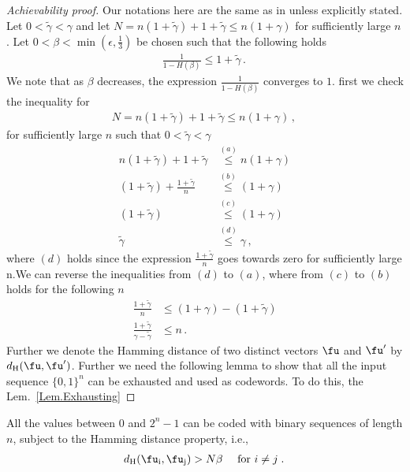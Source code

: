 \begin{proof}[Achievability proof]
Our notations here are the same as in \cite{J85} unless explicitly stated. Let $0<\tilde{\gamma}<\gamma$ and let $N=n(1+\tilde{\gamma})+1+\tilde{\gamma} \leq n(1+\gamma)$ for sufficiently large $n$. Let $0<\beta<\min(\epsilon,\frac{1}{3})$ be chosen such that the following holds
%
\begin{align}
    \frac{1}{1-H(\beta)} \leq 1+\tilde{\gamma} \,.\,
\end{align}
%
We note that as $\beta$ decreases, the expression $ \frac{1}{1-H(\beta)}$ converges to $1$. 
first we check the inequality for
\begin{align}
    N=n(1+\tilde{\gamma})+1+\tilde{\gamma} \leq n(1+\gamma) \,,\,
\end{align}
for sufficiently large $n$ such that $0<\tilde{\gamma}<\gamma$
\begin{align}
    n(1+\tilde{\gamma})+1+\tilde{\gamma} &\stackrel{(a)}{\leq} n(1+\gamma)\\
    (1+\tilde{\gamma})+\frac{1+\tilde{\gamma}}{n} &\stackrel{(b)}{\leq} (1+\gamma)\\
    (1+\tilde{\gamma}) &\stackrel{(c)}{\leq} (1+\gamma)\\
    \tilde{\gamma} &\stackrel{(d)}{\leq} \gamma  \,,\,
\end{align}
where $(d)$ holds since the expression $\frac{1+\tilde{\gamma}}{n}$ goes towards zero for sufficiently large n.We can reverse the inequalities from $(d)$ to $(a)$, where from $(c)$ to $(b)$ holds for the following $n$
\begin{align}
\nonumber
    \frac{1+\tilde{\gamma}}{n} &\leq (1+\gamma)-(1+\tilde{\gamma}) \\
    \nonumber
   \frac{1+\tilde{\gamma}}{\gamma-\tilde{\gamma}} &\leq n  \,.\,
\end{align}
Further we denote the Hamming distance of two distinct vectors $\fu$ and $\fu'$ by $d_{\text{H}}(\fu,\fu')$. Further we need the following lemma to show that all the input sequence $\{0,1\}^n$ can be exhausted and used as codewords. To do this, the Lem.~\ref{Lem.Exhausting}
\end{proof}
\begin{lemma}
\label{Lem.Exhausting}
All the values between $0$ and $2^n-1$ can be coded with binary sequences of length $n$, subject to the Hamming distance property, i.e.,
\begin{align}
    d_{\text{H}}(\fu_{\text{i}},\fu_{\text{j}}) > N\beta \quad \text{ for } i \neq j\;.\,
\end{align}
\end{lemma}
